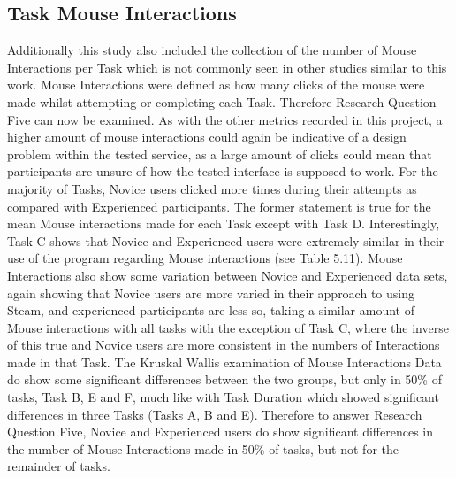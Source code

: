 \subsection{Task Mouse Interactions}
Additionally this study also included the collection of the number of Mouse Interactions per Task which is not commonly seen in other studies similar to this work. Mouse Interactions were defined as how many clicks of the mouse were made whilst attempting or completing each Task. Therefore Research Question Five can now be examined. As with the other metrics recorded in this project, a higher amount of mouse interactions could again be indicative of a design problem within the tested service, as a large amount of clicks could mean that participants are unsure of how the tested interface is supposed to work. For the majority of Tasks, Novice users clicked more times during their attempts as compared with Experienced participants. The former statement is true for the mean Mouse interactions made for each Task except with Task D. Interestingly, Task C shows that Novice and Experienced users were extremely similar in their use of the program regarding Mouse interactions (see Table 5.11). Mouse Interactions also show some variation between Novice and Experienced data sets, again showing that Novice users are more varied in their approach to using Steam, and experienced participants are less so, taking a similar amount of Mouse interactions with all tasks with the exception of Task C, where the inverse of this true and Novice users are more consistent in the numbers of Interactions made in that Task. The Kruskal Wallis examination of Mouse Interactions Data do show some significant differences between the two groups, but only in 50\% of tasks, Task B, E and F, much like with Task Duration which showed significant differences in three Tasks (Tasks A, B and E). Therefore to answer Research Question Five, Novice and Experienced users do show significant differences in the number of Mouse Interactions made in 50\% of tasks, but not for the remainder of tasks.


